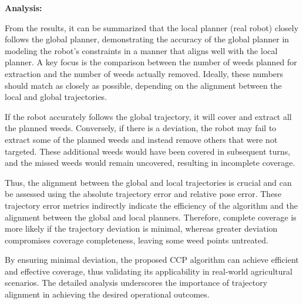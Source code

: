 \textbf{Analysis: } 

From the results, it can be summarized that the local planner (real robot) closely follows the global planner, demonstrating the accuracy of the global planner in modeling the robot's constraints in a manner that aligns well with the local planner. A key focus is the comparison between the number of weeds planned for extraction and the number of weeds actually removed. Ideally, these numbers should match as closely as possible, depending on the alignment between the local and global trajectories.

\vspace*{6mm}   

If the robot accurately follows the global trajectory, it will cover and extract all the planned weeds. Conversely, if there is a deviation, the robot may fail to extract some of the planned weeds and instead remove others that were not targeted. These additional weeds would have been covered in subsequent turns, and the missed weeds would remain uncovered, resulting in incomplete coverage.

\vspace*{6mm}   

Thus, the alignment between the global and local trajectories is crucial and can be assessed using the absolute trajectory error and relative pose error. These trajectory error metrics indirectly indicate the efficiency of the algorithm and the alignment between the global and local planners. Therefore, complete coverage is more likely if the trajectory deviation is minimal, whereas greater deviation compromises coverage completeness, leaving some weed points untreated.

\vspace*{6mm}   

By ensuring minimal deviation, the proposed CCP algorithm can achieve efficient and effective coverage, thus validating its applicability in real-world agricultural scenarios. The detailed analysis underscores the importance of trajectory alignment in achieving the desired operational outcomes.

\vspace*{6mm}   
